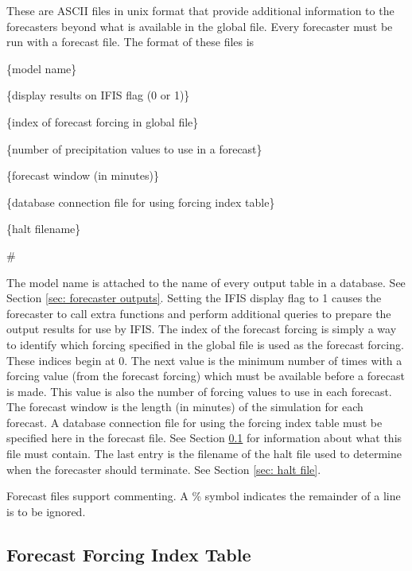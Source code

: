 \documentclass[12pt]{article}
\newenvironment{codeindent}
{\begin{list}{}
        {\setlength{\leftmargin}{.1in}}
        \item[]
}
{\end{list}}
\begin{document}
These are ASCII files in unix format that provide additional information to the forecasters beyond what is available in the global file. Every forecaster must be run with a forecast file. The format of these files is
\begin{codeindent}
\{model name\}

\{display results on IFIS flag (0 or 1)\}

\{index of forecast forcing in global file\}

\{number of precipitation values to use in a forecast\}

\{forecast window (in minutes)\}

\{database connection file for using forcing index table\}

\{halt filename\}

\#
\end{codeindent}
The model name is attached to the name of every output table in a database. See Section \ref{sec: forecaster outputs}. Setting the IFIS display flag to 1 causes the forecaster to call extra functions and perform additional queries to prepare the output results for use by IFIS. The index of the forecast forcing is simply a way to identify which forcing specified in the global file is used as the forecast forcing. These indices begin at 0. The next value is the minimum number of times with a forcing value (from the forecast forcing) which must be available before a forecast is made. This value is also the number of forcing values to use in each forecast. The forecast window is the length (in minutes) of the simulation for each forecast. A database connection file for using the forcing index table must be specified here in the forecast file. See Section \ref{sec: forecast forcing index table} for information about what this file must contain. The last entry is the filename of the halt file used to determine when the forecaster should terminate. See Section \ref{sec: halt file}.

Forecast files support commenting. A \% symbol indicates the remainder of a line is to be ignored.

\subsection{Forecast Forcing Index Table} \label{sec: forecast forcing index table}
\end{document}
